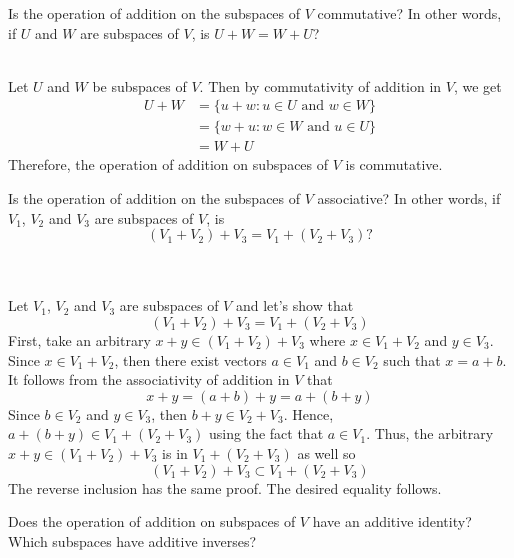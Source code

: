 \begin{exercise}
    Is the operation of addition on the subspaces of $V$ commutative? In other words, if $U$ and $W$ are subspaces of $V$, is $U+W = W +U$? \\
\end{exercise}

\begin{solution}
    \\ Let $U$ and $W$ be subspaces of $V$. Then by commutativity of addition in $V$, we get
    \begin{align*}
        U+W &= \{u+w : u \in U \text{ and } w \in W\} \\
        &= \{w+u : w \in W \text{ and } u \in U\} \\
        &= W + U
    \end{align*}
    Therefore, the operation of addition on subspaces of $V$ is commutative. \\
\end{solution}

\begin{exercise}
    Is the operation of addition on the subspaces of $V$ associative? In other words, if $V_1$, $V_2$ and $V_3$ are subspaces of $V$, is
    $$(V_1 + V_2) + V_3 = V_1 + (V_2 + V_3)?$$ \\
\end{exercise}

\begin{solution}
    \\ Let $V_1$, $V_2$ and $V_3$ are subspaces of $V$ and let's show that 
    $$(V_1 + V_2) + V_3 = V_1 + (V_2 + V_3)$$
    First, take an arbitrary $x + y \in (V_1 + V_2) + V_3$ where $x \in V_1 + V_2$ and $y \in V_3$. Since $x \in V_1 + V_2$, then there exist vectors $a \in V_1$ and $b \in V_2$ such that $x = a+b$. It follows from the associativity of addition in $V$ that
    $$x+y = (a+b) + y = a + (b + y)$$
    Since $b \in V_2$ and $y \in V_3$, then $b+y \in V_2 + V_3$. Hence, $a + (b+y) \in V_1 + (V_2 + V_3)$ using the fact that $a \in V_1$. Thus, the arbitrary $x+y \in (V_1 + V_2) + V_3$ is in $V_1 + (V_2 + V_3)$ as well so 
    $$(V_1 + V_2) + V_3 \subset V_1 + (V_2 + V_3)$$
    The reverse inclusion has the same proof. The desired equality follows. \\
\end{solution}

\begin{exercise}
    Does the operation of addition on subspaces of $V$ have an additive identity? Which subspaces have additive inverses? \\
\end{exercise}

